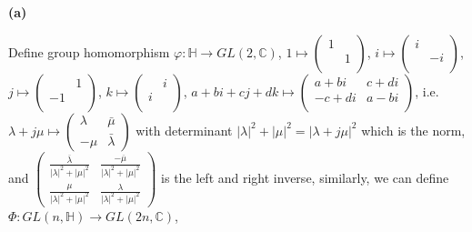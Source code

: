 \documentclass[main]{subfiles}
\newcommand{\<}[1]{\langle #1 \rangle}
\begin{document}
\textbf{(a)} \par
Define group homomorphism $\varphi:\mathbb H\rightarrow GL(2,\mathbb C)$, $1\mapsto \left( {\begin{array}{cc}
1 &  \\
 & 1 \\
\end{array} } \right)$, $i\mapsto \left( {\begin{array}{cc}
i &  \\
 & -i \\
\end{array} } \right)$, $j\mapsto \left( {\begin{array}{cc}
 & 1 \\
-1 &  \\
\end{array} } \right)$, $k\mapsto \left( {\begin{array}{cc}
 & i \\
i &  \\
\end{array} } \right)$, $a+bi+cj+dk\mapsto \left( {\begin{array}{cc}
a+bi & c+di \\
-c+di & a-bi \\
\end{array} } \right)$, i.e. $\lambda+j\mu\mapsto \left( {\begin{array}{cc}
\lambda & \bar{\mu} \\
-\mu & \bar{\lambda}
\end{array} } \right)$ with determinant $|\lambda|^2+|\mu|^2=|\lambda+j\mu|^2$ which is the norm, and $\left( {\begin{array}{cc}
\frac{\overline\lambda}{|\lambda|^2+|\mu|^2} & \frac{-\overline\mu}{|\lambda|^2+|\mu|^2} \\
\frac{\mu}{|\lambda|^2+|\mu|^2} & \frac{\lambda}{|\lambda|^2+|\mu|^2}
\end{array} } \right)$ is the left and right inverse, similarly, we can define $\Phi:GL(n,\mathbb H)\rightarrow GL(2n,\mathbb C)$, \par
\end{document}
